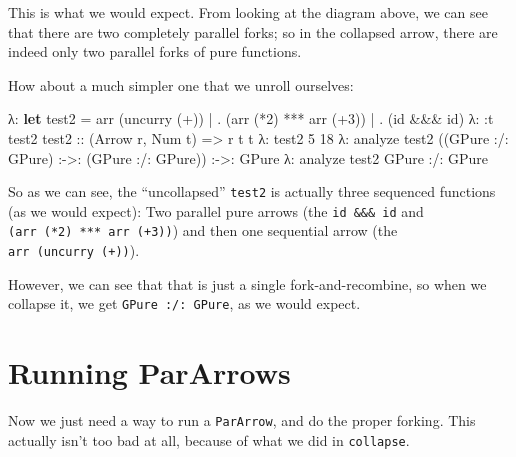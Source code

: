 \documentclass[]{article}
\newenvironment{Shaded}{}{}
\newcommand{\DataTypeTok}[1]{\textcolor[rgb]{0.56,0.13,0.00}{#1}}
\newcommand{\DecValTok}[1]{\textcolor[rgb]{0.25,0.63,0.44}{#1}}
\newcommand{\FunctionTok}[1]{\textcolor[rgb]{0.02,0.16,0.49}{#1}}
\newcommand{\KeywordTok}[1]{\textcolor[rgb]{0.00,0.44,0.13}{\textbf{#1}}}
\newcommand{\NormalTok}[1]{#1}
\newcommand{\OperatorTok}[1]{\textcolor[rgb]{0.40,0.40,0.40}{#1}}
\newcommand{\OtherTok}[1]{\textcolor[rgb]{0.00,0.44,0.13}{#1}}
\begin{document}
This is what we would expect. From looking at the diagram above, we can see that
there are two completely parallel forks; so in the collapsed arrow, there are
indeed only two parallel forks of pure functions.

How about a much simpler one that we unroll ourselves:

\begin{Shaded}
\begin{Highlighting}[]
\NormalTok{λ}\OperatorTok{:} \KeywordTok{let}\NormalTok{ test2 }\OtherTok{=}\NormalTok{ arr (}\FunctionTok{uncurry}\NormalTok{ (}\OperatorTok{+}\NormalTok{))}
 \OperatorTok{|}           \OperatorTok{.}\NormalTok{ (arr (}\OperatorTok{*}\DecValTok{2}\NormalTok{) }\OperatorTok{***}\NormalTok{ arr (}\OperatorTok{+}\DecValTok{3}\NormalTok{))}
 \OperatorTok{|}           \OperatorTok{.}\NormalTok{ (}\FunctionTok{id} \OperatorTok{\&\&\&} \FunctionTok{id}\NormalTok{)}
\NormalTok{λ}\OperatorTok{:} \OperatorTok{:}\NormalTok{t test2}
\OtherTok{test2 ::}\NormalTok{ (}\DataTypeTok{Arrow}\NormalTok{ r, }\DataTypeTok{Num}\NormalTok{ t) }\OtherTok{=>}\NormalTok{ r t t}
\NormalTok{λ}\OperatorTok{:}\NormalTok{ test2 }\DecValTok{5}
\DecValTok{18}
\NormalTok{λ}\OperatorTok{:}\NormalTok{ analyze\textquotesingle{} test2}
\NormalTok{((}\DataTypeTok{GPure} \OperatorTok{:/:} \DataTypeTok{GPure}\NormalTok{) }\OperatorTok{:{-}>:}\NormalTok{ (}\DataTypeTok{GPure} \OperatorTok{:/:} \DataTypeTok{GPure}\NormalTok{)) }\OperatorTok{:{-}>:} \DataTypeTok{GPure}
\NormalTok{λ}\OperatorTok{:}\NormalTok{ analyze test2}
\DataTypeTok{GPure} \OperatorTok{:/:} \DataTypeTok{GPure}
\end{Highlighting}
\end{Shaded}

So as we can see, the ``uncollapsed'' \texttt{test2} is actually three sequenced
functions (as we would expect): Two parallel pure arrows (the
\texttt{id\ \&\&\&\ id} and \texttt{(arr\ (*2)\ ***\ arr\ (+3))}) and then one
sequential arrow (the \texttt{arr\ (uncurry\ (+))}).

However, we can see that that is just a single fork-and-recombine, so when we
collapse it, we get \texttt{GPure\ :/:\ GPure}, as we would expect.

\hypertarget{running-pararrows}{%
\section{Running ParArrows}\label{running-pararrows}}

Now we just need a way to run a \texttt{ParArrow}, and do the proper forking.
This actually isn't too bad at all, because of what we did in \texttt{collapse}.
\end{document}
